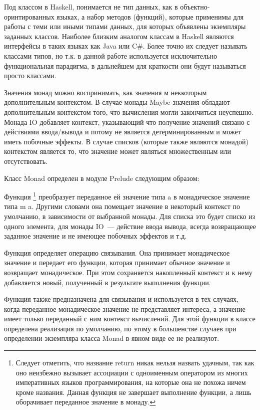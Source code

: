 Под классом в Haskell, понимается не тип данных, как в объектно-оринтированных языках, а набор методов (функций), которые применимы для работы с теми или иными типами данных, для которых объявлены экземпляры заданных классов. Наиболее близким аналогом классам в Haskell являются интерфейсы в таких языках как Java или C\#. Более точно их следует называть классами типов, но т.к. в данной работе используется исключительно функциональная парадигма, в дальнейшем для краткости они будут называться просто классами.

Значения монад можно воспринимать, как значения м неккоторым дополнительным контекстом. В случае монады Maybe значения обладают дополнительным контекстом того, что вычисления могли закончиться неуспешно. Монада IO добавляет контекст, указывающий что получение значений связано с действиями ввода/вывода и потому не является детерминированным и может иметь побочные эффекты. В случае списков (которые также являются монадой) контекстом является то, что значение может являться множественным или отсутствовать.

Класс Monad определен в модуле Prelude следующим образом:



Функция \footnote{Следует отметить, что название return никак нельзя назвать удачным, так как оно неизбежно вызывает ассоциации с одноименным оператором из многих императивных языков программирования, на которые она не похожа ничем кроме названия. Данная функция не завершает выполнение функции, а лишь оборачивает переданное значение в монаду.} преобразует переданное ей значение типа a  в монадическое значение типа m a. Другими словами она помещает значение в некоторый контекст по умолчанию, в зависимости от выбранной монады. Для списка это будет списко из одного элемента, для монады IO~--- действие ввода вывода, всегда возвращающее заданное значение и не имеющее побочных эффектов и т.д.

Функция \Code{$>>=$} определяет операцию связывания. Она принимает монадическое значение и передает его функции, которая принимает обычное значение и возвращает монадическое. При этом сохраняется накопленный контекст и к нему добавляется новый, полученный в результате выполнения функции.

Функция \Code{$>>$} также предназначена для связывания и используется в тех случаях, когда переданное монадическое значение не представляет интереса, а значение имеет только переданный с ним контекст вычислений. Для этой функции в классе определена реализация по умолчанию, по этому в большенстве случаев при определении экземпляра класса Monad в явном виде ее не реализуют.

